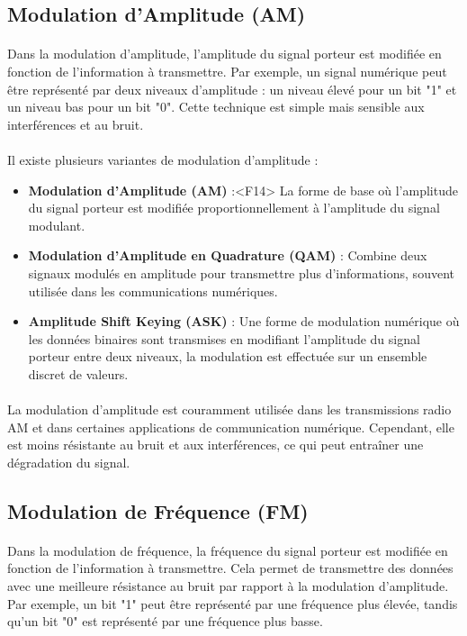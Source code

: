 \documentclass[a4paper,twocolumn]{report}
\begin{document}
\subsection{Modulation d'Amplitude (AM)}
\paragraph{}Dans la modulation d'amplitude, l'amplitude du signal porteur est
modifiée en fonction de l'information à transmettre. Par exemple, un signal numérique
peut être représenté par deux niveaux d'amplitude : un niveau élevé pour un bit "1"
et un niveau bas pour un bit "0". Cette technique est simple mais sensible aux interférences et au bruit.
\paragraph{}Il existe plusieurs variantes de modulation d'amplitude :
\begin{itemize}
	\item \textbf{Modulation d'Amplitude (AM)} :<F14>
    La forme de base où l'amplitude du signal porteur est modifiée proportionnellement à l'amplitude du signal modulant.
	\item \textbf{Modulation d'Amplitude en Quadrature (QAM)} :
    Combine deux signaux modulés en amplitude pour transmettre plus d'informations,
    souvent utilisée dans les communications numériques.
	\item \textbf{Amplitude Shift Keying (ASK)} :
    Une forme de modulation numérique où les données binaires sont transmises en
    modifiant l'amplitude du signal porteur entre deux niveaux,
    la modulation est effectuée sur un ensemble discret de valeurs.
\end{itemize}
\paragraph{}La modulation d'amplitude est couramment utilisée dans les transmissions
radio AM et dans certaines applications de communication numérique. Cependant,
elle est moins résistante au bruit et aux interférences, ce qui peut entraîner une dégradation du signal.

\subsection{Modulation de Fréquence (FM)}
\paragraph{}Dans la modulation de fréquence, la fréquence du signal porteur est
modifiée en fonction de l'information à transmettre. Cela permet de transmettre
des données avec une meilleure résistance au bruit par rapport à la modulation d'amplitude.
Par exemple, un bit "1" peut être représenté par une fréquence plus élevée,
tandis qu'un bit "0" est représenté par une fréquence plus basse.
\end{document}
